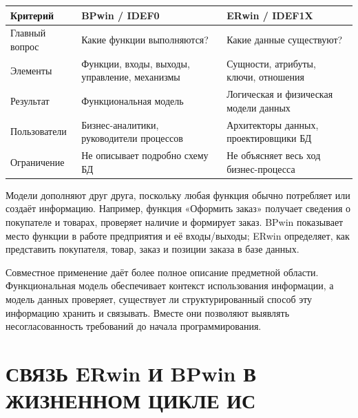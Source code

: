 \documentclass[essaypaper,paper]{pmk-graduate}
\begin{document}
\small

\setlength{\tabcolsep}{4pt}

\renewcommand{\arraystretch}{1.15}

\begin{longtable}{|p{}|p{}|p{}|}

\hline

\textbf{Критерий} & \textbf{BPwin / IDEF0} & \textbf{ERwin / IDEF1X} \\ \hline

Главный вопрос & Какие функции выполняются? & Какие данные существуют? \\ \hline

Элементы & Функции, входы, выходы, управление, механизмы & Сущности, атрибуты, ключи, отношения \\ \hline

Результат & Функциональная модель & Логическая и физическая модели данных \\ \hline

Пользователи & Бизнес-аналитики, руководители процессов & Архитекторы данных, проектировщики БД \\ \hline

Ограничение & Не описывает подробно схему БД & Не объясняет весь ход бизнес-процесса \\ \hline

\end{longtable}

\normalsize

Модели дополняют друг друга, поскольку любая функция обычно потребляет или создаёт информацию. Например, функция «Оформить заказ» получает сведения о покупателе и товарах, проверяет наличие и формирует заказ. BPwin показывает место функции в работе предприятия и её входы/выходы; ERwin определяет, как представить покупателя, товар, заказ и позиции заказа в базе данных.

\par

Совместное применение даёт более полное описание предметной области. Функциональная модель обеспечивает контекст использования информации, а модель данных проверяет, существует ли структурированный способ эту информацию хранить и связывать. Вместе они позволяют выявлять несогласованность требований до начала программирования.

\par

\chapter{СВЯЗЬ ERwin И BPwin В ЖИЗНЕННОМ ЦИКЛЕ ИС}
\end{document}
